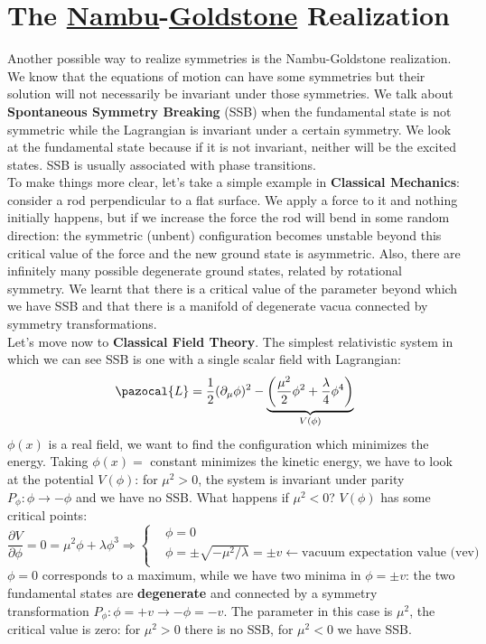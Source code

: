\documentclass[../main.tex]{subfiles}
\begin{document}
\section{The \href{https://en.wikipedia.org/wiki/Yoichiro_Nambu}{Nambu}-\href{https://en.wikipedia.org/wiki/Jeffrey_Goldstone}{Goldstone} Realization}
Another possible way to realize symmetries is the Nambu-Goldstone realization. We know that the equations of motion can have some symmetries but their solution will not necessarily be invariant under those symmetries. We talk about \textbf{Spontaneous Symmetry Breaking} (SSB) when the fundamental state is not symmetric while the Lagrangian is invariant under a certain symmetry. We look at the fundamental state because if it is not invariant, neither will be the excited states. SSB is usually associated with phase transitions.\\
To make things more clear, let's take a simple example in \textbf{Classical Mechanics}: consider a rod perpendicular to a flat surface. We apply a force to it and nothing initially happens, but if we increase the force the rod will bend in some random direction: the symmetric (unbent) configuration becomes unstable beyond this critical value of the force and the new ground state is asymmetric. Also, there are infinitely many possible degenerate ground states, related by rotational symmetry. We learnt that there is a critical value of the parameter beyond which we have SSB and that there is a manifold of degenerate vacua connected by symmetry transformations.\\
Let's move now to \textbf{Classical Field Theory}. The simplest relativistic system in which we can see SSB is one with a single scalar field with Lagrangian:
\[
\pazocal{L}=\frac{1}{2}(\partial_\mu\phi)^2-\underbrace{\left(\frac{\mu^2}{2}\phi^2+\frac{\lambda}{4}\phi^4\right)}_{V(\phi)}
\]
$\phi(x)$ is a real field, we want to find the configuration which minimizes the energy. Taking $\phi(x)=$ constant minimizes the kinetic energy, we have to look at the potential $V(\phi)$: for $\mu^2>0$, the system is invariant under parity $P_\phi:\phi\to-\phi$ and we have no SSB. What happens if $\mu^2<0$? $V(\phi)$ has some critical points:
\[
\frac{\partial V}{\partial\phi}=0=\mu^2\phi+\lambda\phi^3\Rightarrow
\left\{
\begin{aligned}
&\phi=0\\
&\phi=\pm\sqrt{-\mu^2/\lambda}=\pm v\xleftarrow[]{}\text{vacuum expectation value (vev)}
\end{aligned}
\right.
\]
$\phi=0$ corresponds to a maximum, while we have two minima in $\phi=\pm v$: the two fundamental states are \textbf{degenerate} and connected by a symmetry transformation $P_\phi: \phi=+v\to-\phi=-v$. The parameter in this case is $\mu^2$, the critical value is zero: for $\mu^2>0$ there is no SSB, for $\mu^2<0$ we have SSB.\\
\end{document}
